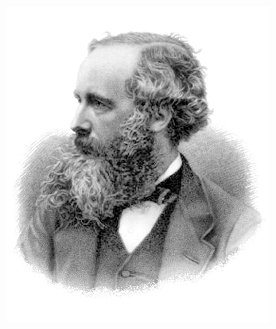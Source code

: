 \documentclass{beamer}
\begin{document}
\begin{frame}
\begin{columns}[c]
			\begin{figure}[h]
				\centering
				\includegraphics[width=1\textwidth]{Presentacion/James_Clerk_Maxwell.png}
			\end{figure}
			
		\end{columns}
				
		
		
		\end{frame}
		
\end{document}

